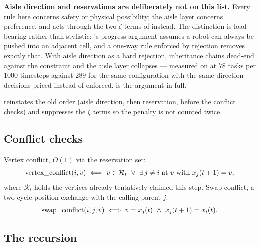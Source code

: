 \begin{caveat}
\textbf{Aisle direction and reservations are deliberately not on this list.}
Every rule here concerns safety or physical possibility; the aisle layer
concerns preference, and acts through the two $\zeta$ terms of
 instead. The distinction is load-bearing rather than
stylistic: 's progress argument assumes a robot can
always be pushed into an adjacent cell, and a one-way rule enforced by
rejection removes exactly that. With aisle direction as a hard rejection,
inheritance chains dead-end against the constraint and the aisle layer
collapses --- measured on  at $78$ tasks per 1000
timesteps against $289$ for the same configuration with the same direction decisions
priced instead of enforced.
 is the argument in full.

  reinstates the old order
(aisle direction, then reservation, before the conflict checks) and suppresses
the $\zeta$ terms so the penalty is not counted twice.
\end{caveat}

\subsection{Conflict checks}
\label{sec:pibt-conflicts}

Vertex conflict, $O(1)$ via the reservation set:
\begin{equation}
  \mathrm{vertex\_conflict}(i, v) \iff
    v \in \mathcal{R}_t
    \ \vee\
    \exists\, j \neq i \text{ at } v \text{ with } x_{j}(t+1) = v,
\end{equation}
where $\mathcal{R}_t$ holds the vertices already tentatively claimed this step.
Swap conflict, a two-cycle position exchange with the calling parent $j$:
\begin{equation}
  \mathrm{swap\_conflict}(i, j, v) \iff
    v = x_{j}(t) \ \wedge\ x_{j}(t+1) = x_{i}(t).
\end{equation}

\subsection{The recursion}
\label{sec:pibt-recursion}

